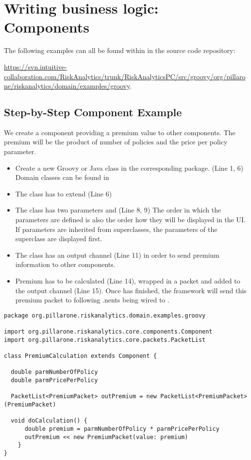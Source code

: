 \chapter{Writing business logic: Components}

The following examples can all be found within in the \RA{} source code repository:

\url{https://svn.intuitive-collaboration.com/RiskAnalytics/trunk/RiskAnalyticsPC/src/groovy/org/pillarone/riskanalytics/domain/examples/groovy}.

\section{Step-by-Step Component Example}
\label{sec:comp-eg-steps}

We create a component providing a premium value to other components. The premium will be the product of number of policies and the price per policy parameter.

\begin{itemize}
  \item Create a new Groovy or Java class in the corresponding package. (Line 1, 6) \\ Domain classes can be found in 
  \item The class has to extend  (Line 6)
  \item The class has two parameters  and  (Line 8, 9) The order in which the parameters are defined is also the order how they will be displayed in the UI. If parameters are inherited from superclasses, the parameters of the superclass are displayed first.
  \item The class has an output channel  (Line 11) in order to send premium information to other components.
  \item Premium has to be calculated (Line 14), wrapped in a packet and added to the output channel (Line 15). Once  has finished, the framework will send this premium packet to following .nents being wired to .
\end{itemize}

\begin{lstlisting}[label=lst:premcalc]
package org.pillarone.riskanalytics.domain.examples.groovy

import org.pillarone.riskanalytics.core.components.Component
import org.pillarone.riskanalytics.core.packets.PacketList

class PremiumCalculation extends Component {

  double parmNumberOfPolicy
  double parmPricePerPolicy

  PacketList<PremiumPacket> outPremium = new PacketList<PremiumPacket>(PremiumPacket)

  void doCalculation() {
      double premium = parmNumberOfPolicy * parmPricePerPolicy
      outPremium << new PremiumPacket(value: premium)
    }
}\end{lstlisting}

